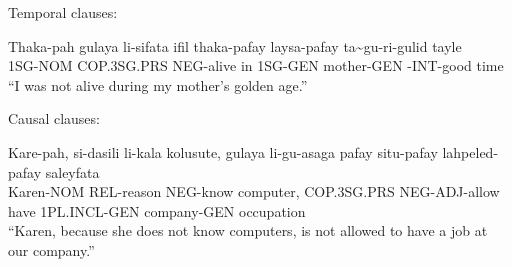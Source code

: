 Temporal clauses:
\begin{exe}
    \ex{} \gll{}Thaka-pah gulaya      li-sifata ifil thaka-pafay laysa-pafay ta\~{}gu-ri-gulid  tayle\\
                1SG-NOM   COP.3SG.PRS NEG-alive in   1SG-GEN     mother-GEN  \agradj{}-INT-good time\\
          \glt{}``I was not alive during my mother's golden age.''
\end{exe}

Causal clauses:
\begin{exe}
    \ex{} \gll{}Kare-pah, si-dasili  li-kala  kolusute, gulaya      li-gu-asaga   pafay situ-pafay   lahpeled-pafay saleyfata\\
    Karen-NOM REL-reason NEG-know computer, COP.3SG.PRS NEG-ADJ-allow have  1PL.INCL-GEN company-GEN    occupation\\
    \glt{}``Karen, because she does not know computers, is not allowed to have a job at our company.''
\end{exe}
